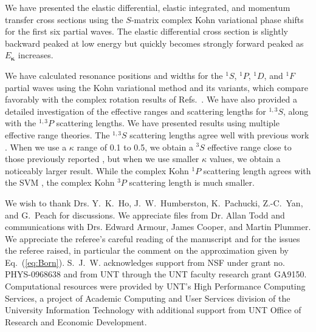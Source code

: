 \documentclass[preprint,showpacs,showkeys,preprintnumbers,amsmath,amssymb,longbibliography,pra,aps]{revtex4-1}
\begin{document}
We have presented the elastic differential, elastic integrated, and momentum 
transfer cross sections using the $S$-matrix 
complex Kohn variational phase shifts for the first six partial waves.
The elastic differential cross section is slightly backward peaked at
low energy but quickly becomes strongly forward peaked as $E_{\bm \kappa}$
increases.

We have calculated resonance positions and widths for the $^1S$, $^1P$, $^1D$, and
$^1F$ partial waves using the Kohn variational method and its variants,
which compare favorably with the complex 
rotation results of Refs.~\cite{Yan1999,Yan1998a,Ho1998,Ho2000}. We have also 
provided a detailed investigation of the effective ranges and scattering 
lengths for $^{1,3}S$, along with the $^{1,3}P$ scattering lengths. We have
presented results using multiple effective range theories.
The $^{1,3}S$ scattering 
lengths agree well with previous work
\cite{VanReeth2003,Blackwood2002,Walters2004,Ivanov2002}.
When we use a $\kappa$ range of 0.1 to 0.5, we obtain a $^3S$ effective
range close to those previously reported
\cite{VanReeth2003,Blackwood2002,Ivanov2002}, but when we use smaller $\kappa$
values, we obtain a noticeably larger result.
While the complex Kohn $^1P$ scattering length agrees with the SVM
\cite{Ivanov2002}, the complex Kohn $^3P$ scattering length is much smaller.


\begin{acknowledgments}
We wish to thank Drs. Y.~K.~Ho, J.~W.~Humberston, K.~Pachucki,
Z.-C.~Yan, and G.~Peach for discussions. We appreciate files from Dr. Allan
Todd and communications with Drs. Edward Armour, James Cooper, and Martin 
Plummer. We appreciate the referee's careful reading of the manuscript and for
the issues the referee raised, in particular the comment on the approximation
given by Eq.~(\ref{eq:Born}).
S.~J.~W. acknowledges support from NSF under grant no. PHYS-0968638 
and from UNT through the UNT faculty research grant GA9150. Computational 
resources were provided by UNT's High Performance Computing Services, a 
project of Academic Computing and User Services division of the University 
Information Technology with additional support from UNT Office of Research 
and Economic Development.
\end{acknowledgments}



\end{document}
